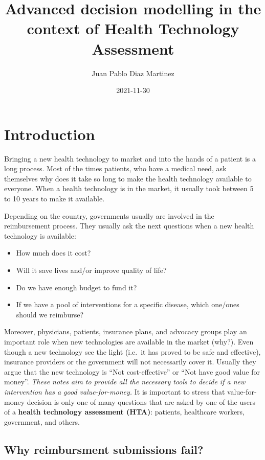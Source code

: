 \documentclass[
]{book}
\title{Advanced decision modelling in the context of Health Technology Assessment}
\author{Juan Pablo Diaz Martinez}
\date{2021-11-30}
\providecommand{\tightlist}{%
  \setlength{\itemsep}{0pt}\setlength{\parskip}{0pt}}
\begin{document}
\maketitle

{
\setcounter{tocdepth}{1}
\tableofcontents
}
\hypertarget{introduction}{%
\chapter*{Introduction}\label{introduction}}

Bringing a new health technology to market and into the hands of a patient is a long process. Most of the times patients, who have a medical need, ask themselves why does it take so long to make the health technology available to everyone. When a health technology is in the market, it usually took between 5 to 10 years to make
it available.

Depending on the country, governments usually are involved in the reimbursement process. They usually ask the next questions when a new health technology is available:

\begin{itemize}
\tightlist
\item
  How much does it cost?
\item
  Will it save lives and/or improve quality of life?
\item
  Do we have enough budget to fund it?
\item
  If we have a pool of interventions for a specific disease, which one/ones should we reimburse?
\end{itemize}

Moreover, physicians, patients, insurance plans, and advocacy groups play an important role when new technologies are available in the market (why?). Even though a new technology see the light (i.e.~it has proved to be safe and effective), insurance providers or the government will not necessarily cover it. Usually they argue that the new technology is ``Not cost-effective'' or ``Not have good value for money''. \emph{These notes aim to provide all the necessary tools to decide if a new intervention has a good value-for-money.} It is important to stress that value-for-money decision is only one of many questions that are asked by one of the users of a \textbf{health technology assessment (HTA)}: patients, healthcare workers, government, and others.

\hypertarget{why-reimbursment-submissions-fail}{%
\section*{Why reimbursment submissions fail?}\label{why-reimbursment-submissions-fail}}
\end{document}
